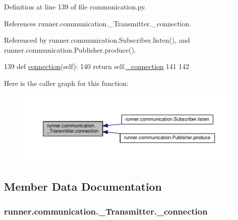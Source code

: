 Definition at line 139 of file communication.\+py.



References runner.\+communication.\+\_\+\+Transmitter.\+\_\+connection.



Referenced by runner.\+communication.\+Subscriber.\+listen(), and runner.\+communication.\+Publisher.\+produce().


\begin{DoxyCode}
139     \textcolor{keyword}{def }\hyperlink{classrunner_1_1communication_1_1__Transmitter_a3aade0da93d3fedb18bec5c5f90a4dd3}{connection}(self):
140         \textcolor{keywordflow}{return} self.\hyperlink{classrunner_1_1communication_1_1__Transmitter_a2c4343348f0825cac9384db1ddcd9c4e}{\_connection}
141 
142 
\end{DoxyCode}


Here is the caller graph for this function\+:
\nopagebreak
\begin{figure}[H]
\begin{center}
\leavevmode
\includegraphics[width=350pt]{classrunner_1_1communication_1_1__Transmitter_a3aade0da93d3fedb18bec5c5f90a4dd3_icgraph}
\end{center}
\end{figure}




\subsection{Member Data Documentation}
\hypertarget{classrunner_1_1communication_1_1__Transmitter_a2c4343348f0825cac9384db1ddcd9c4e}{}
\subsubsection[{\+\_\+connection}]{\setlength{\rightskip}{0pt plus 5cm}runner.\+communication.\+\_\+\+Transmitter.\+\_\+connection\hspace{0.3cm}{\ttfamily [private]}}\label{classrunner_1_1communication_1_1__Transmitter_a2c4343348f0825cac9384db1ddcd9c4e}


